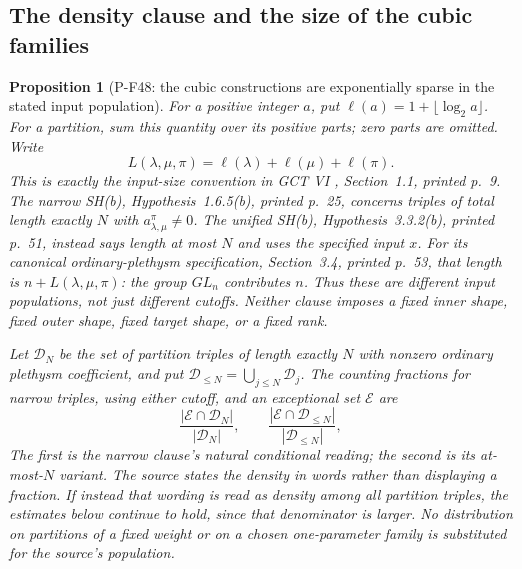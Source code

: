 \documentclass[11pt,a4paper]{article}
\newtheorem{proposition}{Proposition}[section]
\begin{document}
\subsection{The density clause and the size of the cubic families}
\label{sec:cubicdensityscope}

\begin{proposition}[P-F48: the cubic constructions are exponentially sparse in the stated input population]
\label{prop:cubicdensityscope}
For a positive integer $a$, put
$\ell(a)=1+\lfloor\log_2a\rfloor$. For a partition, sum this
quantity over its positive parts; zero parts are omitted.
Write
\[
 L(\lambda,\mu,\pi)=\ell(\lambda)+\ell(\mu)+\ell(\pi).
\]
This is exactly the input-size convention in GCT VI \cite{PGCTVI},
Section~1.1, printed p.~9. The narrow SH(b), Hypothesis~1.6.5(b),
printed p.~25, concerns triples of total length \emph{exactly}
$N$ with $a_{\lambda,\mu}^{\pi}\ne0$. The unified SH(b),
Hypothesis~3.3.2(b), printed p.~51, instead says length
\emph{at most} $N$ and uses the specified input $x$.
For its canonical ordinary-plethysm specification,
Section~3.4, printed p.~53, that length is
$n+L(\lambda,\mu,\pi)$: the group $GL_n$ contributes $n$.
Thus these are different input populations, not just
different cutoffs. Neither clause imposes a fixed inner
shape, fixed outer shape, fixed target shape, or a fixed rank.

Let $\mathcal D_N$ be the set of partition triples of length
exactly $N$ with nonzero ordinary plethysm coefficient, and
put $\mathcal D_{\le N}=\bigcup_{j\le N}\mathcal D_j$.
The counting fractions for narrow triples, using either cutoff,
and an exceptional set
$\mathcal E$ are
\[
 \frac{|\mathcal E\cap\mathcal D_N|}{|\mathcal D_N|},
 \qquad
 \frac{|\mathcal E\cap\mathcal D_{\le N}|}
      {|\mathcal D_{\le N}|},
 \tag{P-F48a}
\]
The first is the narrow clause's natural
conditional reading; the second is its at-most-$N$ variant.
The source states the density in words rather than displaying
a fraction. If instead that wording is read
as density among all partition triples, the estimates below
continue to hold, since that denominator is larger. No
distribution on partitions of a fixed weight or on a chosen
one-parameter family is substituted for the source's population.


\end{proposition}
\end{document}
